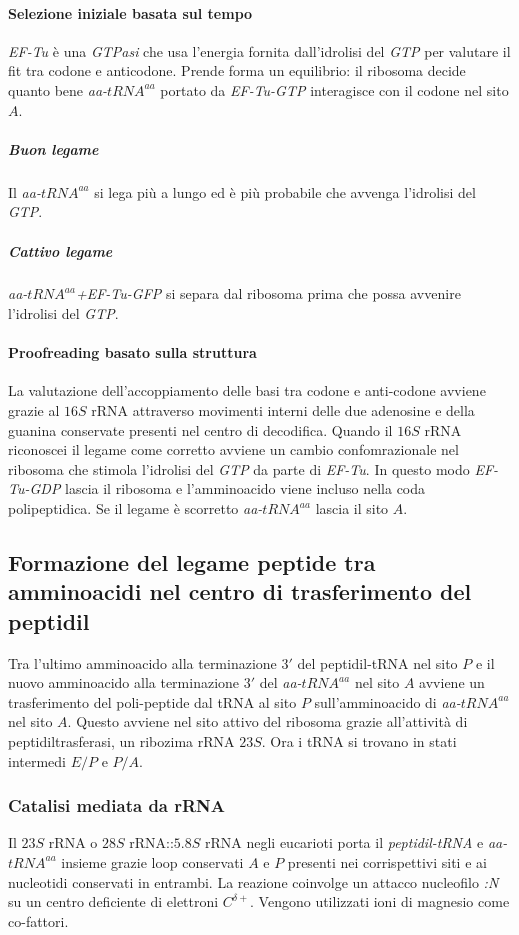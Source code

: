\paragraph{Selezione iniziale basata sul tempo}
\emph{EF-Tu} \`e una \emph{GTPasi} che usa l'energia fornita dall'idrolisi del \emph{GTP} per valutare il fit tra codone e anticodone. Prende forma un equilibrio: il ribosoma 
decide quanto bene \emph{aa-$tRNA^{aa}$} portato da \emph{EF-Tu-GTP} interagisce con il codone nel sito $A$. 
\subparagraph{Buon legame} 
Il \emph{aa-$tRNA^{aa}$} si lega pi\`u a lungo ed \`e pi\`u probabile che avvenga l'idrolisi del \emph{GTP}.
\subparagraph{Cattivo legame}
\emph{aa-$tRNA^{aa}$+EF-Tu-GFP} si separa dal ribosoma prima che possa avvenire l'idrolisi del \emph{GTP}.
\paragraph{Proofreading basato sulla struttura}
La valutazione dell'accoppiamento delle basi tra codone e anti-codone avviene grazie al $16S$ rRNA attraverso movimenti interni delle due adenosine e della guanina conservate
presenti nel centro di decodifica. Quando il $16S$ rRNA riconoscei il legame come corretto avviene un cambio confomrazionale nel ribosoma che stimola l'idrolisi del \emph{GTP} da 
parte di \emph{EF-Tu}. In questo modo \emph{EF-Tu-GDP} lascia il ribosoma e l'amminoacido viene incluso nella coda polipeptidica. Se il legame \`e scorretto \emph{aa-$tRNA^{aa}$} lascia
il sito $A$. 
\subsection{Formazione del legame peptide tra amminoacidi nel centro di trasferimento del peptidil}
Tra l'ultimo amminoacido alla terminazione $3'$ del peptidil-tRNA nel sito $P$ e il nuovo amminoacido alla terminazione $3'$ del \emph{aa-$tRNA^{aa}$} nel sito $A$ avviene un 
trasferimento del poli-peptide dal tRNA al sito $P$ sull'amminoacido di \emph{aa-$tRNA^{aa}$} nel sito $A$. Questo avviene nel sito attivo del ribosoma grazie all'attivit\`a di
peptidiltrasferasi, un ribozima rRNA $23S$. Ora i tRNA si trovano in stati intermedi $E/P$ e $P/A$. 
\subsubsection{Catalisi mediata da rRNA}
Il $23S$ rRNA o $28S$ rRNA::$5.8S$ rRNA negli eucarioti porta il \emph{peptidil-tRNA} e \emph{aa-$tRNA^{aa}$} insieme grazie loop conservati $A$ e $P$ presenti nei corrispettivi siti e
ai nucleotidi conservati in entrambi. La reazione coinvolge un attacco nucleofilo \emph{:N} su un  centro deficiente di elettroni \emph{$C^{\delta+}$}. Vengono utilizzati ioni di 
magnesio come co-fattori. 
